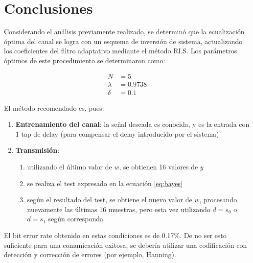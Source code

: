 \documentclass[main.tex]{subfiles}
\begin{document}
\section{Conclusiones}

Considerando el an\'alisis previamente realizado, se determin\'o que la ecualizaci\'on \'optima del canal se logra con un esquema de inversi\'on de sistema, actualizando los coeficientes del filtro adaptativo mediante el m\'etodo RLS. Los par\'ametros \'optimos de este procedimiento se determinaron como:

\begin{equation}
\begin{aligned}
	N &= 5 \\
	\lambda &= 0.9738 \\
	\delta &= 0.1
\end{aligned}
\end{equation}

El m\'etodo recomendado es, pues:

\begin{enumerate}
	\item \textbf{Entrenamiento del canal}: la se\~nal deseada es conocida, y es la entrada
	con 1 tap de delay (para compensar el delay introducido por el sistema) 
	\item \textbf{Transmisi\'on}: 
	\begin{enumerate}
		\item utilizando el \'ultimo valor de $w$, se obtienen 16 valores de $y$
		\item se realiza el test expresado en la ecuaci\'on \ref{eq:bayes}
		\item seg\'un el resultado del test, se obtiene el nuevo valor de $w$, procesando
		nuevamente las \'ultimas 16 muestras, pero esta vez utilizando $d=s_0$ o $d=s_1$
		seg\'un corresponda
	\end{enumerate} 
\end{enumerate}

El bit error rate obtenido en estas condiciones es de 0.17\%. De no ser esto suficiente para una comunicaci\'on exitosa, se deber\'ia utilizar una codificaci\'on con detecci\'on y correcci\'on de errores (por ejemplo, Hanning).
\end{document}
